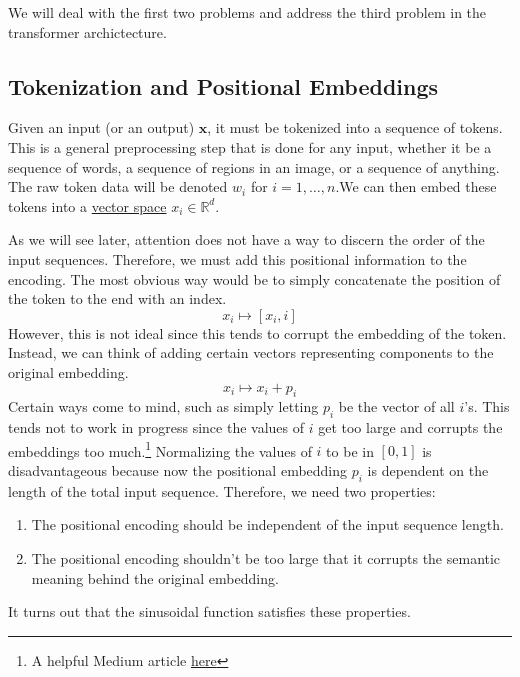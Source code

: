     We will deal with the first two problems and address the third problem in the transformer archictecture. 

\subsection{Tokenization and Positional Embeddings}

  Given an input (or an output) $\mathbf{x}$, it must be tokenized into a sequence of tokens. This is a general preprocessing step that is done for any input, whether it be a sequence of words, a sequence of regions in an image, or a sequence of anything. The raw token data will be denoted $w_i$ for $i = 1, \ldots, n$.We can then embed these tokens into a \hyperref[lin-def:vector-space]{vector space} $x_i \in \mathbb{R}^d$. 

  As we will see later, attention does not have a way to discern the order of the input sequences. Therefore, we must add this positional information to the encoding. The most obvious way would be to simply concatenate the position of the token to the end with an index. 
  \begin{equation} 
    x_i \mapsto [x_i, i]
  \end{equation}
  However, this is not ideal since this tends to corrupt the embedding of the token. Instead, we can think of adding certain vectors representing components to the original embedding. 
  \begin{equation} 
    x_i \mapsto x_i + p_i
  \end{equation}
  Certain ways come to mind, such as simply letting $p_i$ be the vector of all $i$'s. This tends not to work in progress since the values of $i$ get too large and corrupts the embeddings too much.\footnote{A helpful Medium article \href{https://medium.com/@waelrashwan/demystifying-transformer-architecture-the-magic-of-positional-encoding-5fe8154d4a64}{here}} Normalizing the values of $i$ to be in $[0, 1]$ is disadvantageous because now the positional embedding $p_i$ is dependent on the length of the total input sequence. Therefore, we need two properties: 
  \begin{enumerate} 
    \item The positional encoding should be independent of the input sequence length. 
    \item The positional encoding shouldn't be too large that it corrupts the semantic meaning behind the original embedding. 
  \end{enumerate}
  It turns out that the sinusoidal function satisfies these properties. 

